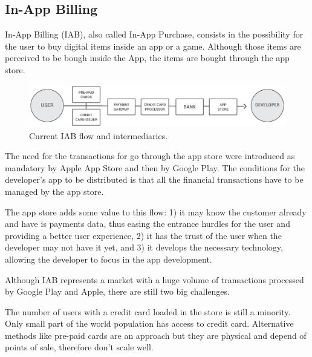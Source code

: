 \subsection{In-App Billing}


In-App Billing (IAB), also called In-App Purchase, consists in the possibility for the user to buy digital items inside an app or a game. Although those items are perceived to be bough inside the App, the items are bought through the app store.

\begin{figure}[!ht]
\centering
\includegraphics[width=\textwidth]{diagrams/iab_flow.eps}
\caption{Current IAB flow and intermediaries.}
\label{fig:iab_flow}
\end{figure}


The need for the transactions for go through the app store were introduced as mandatory by Apple App Store and then by Google Play. The conditions for the developer's app to be distributed is that all the financial transactions have to be managed by the app store. 

The app store adds some value to this flow: 1) it may know the customer already and have is payments data, thus easing the entrance hurdles for the user and providing a better user experience, 2) it has the trust of the user when the developer may not have it yet, and 3) it develops the necessary technology, allowing the developer to focus in the app development.

Although IAB represents a market with a huge volume of transactions processed by Google Play and Apple, there are still two big challenges.


The number of users with a credit card loaded in the store is still a minority. Only small part of the world population has access to credit card. Alternative methods like pre-paid cards are an approach but they are physical and depend of points of sale, therefore don't scale well.


